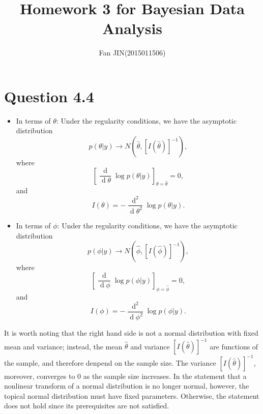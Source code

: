 \documentclass{article}
\DeclareMathOperator*{\deriv}{d}
\begin{document}
\title{\textsf{Homework 3 for Bayesian Data Analysis}}
\author{Fan JIN\quad (2015011506)}
\maketitle

\section*{Question 4.4}
{
    \begin{itemize}

        \item{In terms of $\theta$: } Under the regularity conditions, we have the asymptotic distribution
        $$p(\theta | y) \rightarrow N(\hat{\theta}, [I(\hat{\theta})]^{-1}),$$ where $$\left[ \frac{\deriv}{\deriv \theta} \log{p(\theta|y)} \right]_{\theta = \hat{\theta}} = 0,$$ and $$I(\theta) = -\frac{\deriv^2}{\deriv \theta^2} \log{p(\theta|y)}.$$
    
        \item{In terms of $\phi$: } Under the regularity conditions, we have the asymptotic distribution
        $$p(\phi | y) \rightarrow N(\hat{\phi}, [I(\hat{\phi})]^{-1}),$$ where $$\left[ \frac{\deriv}{\deriv \phi} \log{p(\phi|y)} \right]_{\phi = \hat{\phi}} = 0,$$ and $$I(\phi) = -\frac{\deriv^2}{\deriv \phi^2} \log{p(\phi|y)}.$$    
    
    \end{itemize}

    It is worth noting that the right hand side is not a normal distribution with fixed mean and variance; instead, the mean $\hat{\theta}$ and variance $[I(\hat{\theta})]^{-1}$ are functions of the sample, and therefore denpend on the sample size. The variance $[I(\hat{\theta})]^{-1}$, moreover, converges to $0$ as the sample size increases. In the statement that a nonlinear transform of a normal distribution is no longer normal, however, the topical normal distribution must have fixed parameters. Otherwise, the statement does not hold since its prerequisites are not satisfied. 

}
\end{document}
